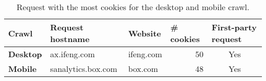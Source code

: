 \begin{table}[ht] 
\caption{Request with the most cookies for the desktop and mobile crawl.} 
\centering 
\begin{tabular}{|l|l|l|r|c|} 
\hline\textbf{Crawl} & \textbf{Request hostname} & \textbf{Website} & \multicolumn{1}{l|}{\textbf{\# cookies}} & \multicolumn{1}{l|}{\textbf{First-party request}} \\ \hline 
\textbf{Desktop} & ax.ifeng.com & ifeng.com & 50 & Yes \\ \hline 
\textbf{Mobile} & sanalytics.box.com & box.com & 48 & Yes \\ \hline 
\end{tabular} 
\label{tab:mostcookies} 
\end{table}